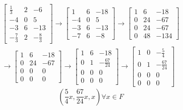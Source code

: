 \documentclass{article}
\begin{document}
\begin{enumerate}[listparindent=\parindent]
\begin{gather*}
    \begin{bmatrix}
        \frac{1}{3} & 2 & -6 \\
        -4 & 0 & 5 \\
        -3 & 6 & -13 \\
        -\frac{7}{3} & 2 & -\frac{8}{3}
    \end{bmatrix}
    \rightarrow
    \begin{bmatrix}
        1 & 6 & -18 \\
        -4 & 0 & 5 \\
        -3 & 6 & -13 \\
        -7 & 6 & -8
    \end{bmatrix}
    \rightarrow
    \begin{bmatrix}
        1 & 6 & -18 \\
        0 & 24 & -67 \\
        0 & 24 & -67 \\
        0 & 48 & -134
    \end{bmatrix}
    \\
    \rightarrow
    \begin{bmatrix}
        1 & 6 & -18 \\
        0 & 24 & -67 \\
        0 & 0 & 0 \\
        0 & 0 & 0
    \end{bmatrix}
    \rightarrow
    \begin{bmatrix}
        1 & 6 & -18 \\
        0 & 1 & -\frac{67}{24} \\
        0 & 0 & 0 \\
        0 & 0 & 0
    \end{bmatrix}
    \rightarrow
    \begin{bmatrix}
        1 & 0 & -\frac{5}{4} \\
        0 & 1 & -\frac{67}{24} \\
        0 & 0 & 0 \\
        0 & 0 & 0
    \end{bmatrix}
\end{gather*}
\[
    \boxed {
        (\frac{5}{4}x, \frac{67}{24}x, x) \forall x \in F
    }
\]


\end{enumerate}
\end{document}
